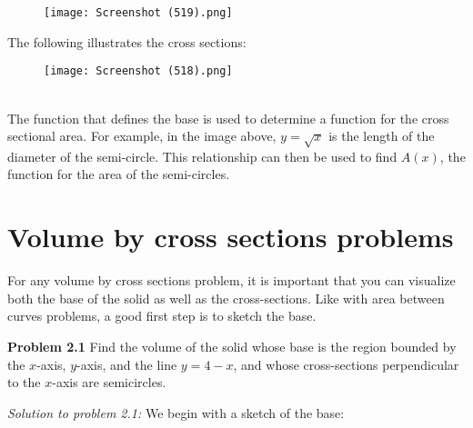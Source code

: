 \documentclass[11pt]{scrartcl}
\begin{document}
\begin{figure}[htp]
    \centering
    \texttt{[image: Screenshot (519).png]}
\end{figure}
\noindent 
The following illustrates the cross sections:
\begin{figure}[htp]
    \centering
    \texttt{[image: Screenshot (518).png]}
\end{figure}\\
\noindent 
The function that defines the base is used to determine a function for the cross sectional area. For example, in the image above, $y=\sqrt{x}$ is the length of the diameter of the semi-circle. This relationship can then be used to find $A(x)$, the function for the area of the semi-circles. 
\section{Volume by cross sections problems}
\noindent 
For any volume by cross sections problem, it is important that you can visualize both the base of the solid as well as the cross-sections. Like with area between curves problems, a good first step is to sketch the base. 
\begin{tcolorbox}[colback=purple!5!white,colframe=purple!75!black]
\textbf{Problem 2.1} Find the volume of the solid whose base is the region bounded by the $x$-axis, $y$-axis, and the line $y=4-x$, and whose cross-sections perpendicular to the $x$-axis are semicircles. 
\end{tcolorbox}
\noindent 
\textit{Solution to problem 2.1:} We begin with a sketch of the base: 
\end{document}
